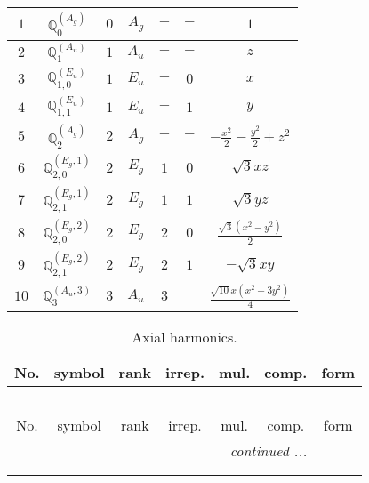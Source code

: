 \documentclass[fleqn,10pt,landscape]{article}
\begin{document}
\begin{itemize}
\begin{center}
\begin{longtable}{ccccccc}
$ 1 $ & $ \mathbb{Q}_{0}^{(A_{g})} $ & $ 0 $ & $ A_{g} $ & $ - $ & $ - $ & $ 1 $ \\ \hline
$ 2 $ & $ \mathbb{Q}_{1}^{(A_{u})} $ & $ 1 $ & $ A_{u} $ & $ - $ & $ - $ & $ z $ \\
$ 3 $ & $ \mathbb{Q}_{1,0}^{(E_{u})} $ & $ 1 $ & $ E_{u} $ & $ - $ & $ 0 $ & $ x $ \\
$ 4 $ & $ \mathbb{Q}_{1,1}^{(E_{u})} $ & $ 1 $ & $ E_{u} $ & $ - $ & $ 1 $ & $ y $ \\ \hline
$ 5 $ & $ \mathbb{Q}_{2}^{(A_{g})} $ & $ 2 $ & $ A_{g} $ & $ - $ & $ - $ & $ - \frac{x^{2}}{2} - \frac{y^{2}}{2} + z^{2} $ \\
$ 6 $ & $ \mathbb{Q}_{2,0}^{(E_{g},1)} $ & $ 2 $ & $ E_{g} $ & $ 1 $ & $ 0 $ & $ \sqrt{3} x z $ \\
$ 7 $ & $ \mathbb{Q}_{2,1}^{(E_{g},1)} $ & $ 2 $ & $ E_{g} $ & $ 1 $ & $ 1 $ & $ \sqrt{3} y z $ \\
$ 8 $ & $ \mathbb{Q}_{2,0}^{(E_{g},2)} $ & $ 2 $ & $ E_{g} $ & $ 2 $ & $ 0 $ & $ \frac{\sqrt{3} \left(x^{2} - y^{2}\right)}{2} $ \\
$ 9 $ & $ \mathbb{Q}_{2,1}^{(E_{g},2)} $ & $ 2 $ & $ E_{g} $ & $ 2 $ & $ 1 $ & $ - \sqrt{3} x y $ \\ \hline
$ 10 $ & $ \mathbb{Q}_{3}^{(A_{u},3)} $ & $ 3 $ & $ A_{u} $ & $ 3 $ & $ - $ & $ \frac{\sqrt{10} x \left(x^{2} - 3 y^{2}\right)}{4} $ \\
\end{longtable}
\end{center}
\begin{center}
\renewcommand{\arraystretch}{1.3}
\begin{longtable}{ccccccc}
\caption{Axial harmonics.}
 \\
 \hline \hline
No. & symbol & rank & irrep. & mul. & comp. & form \\ \hline \endfirsthead

\multicolumn{6}{l}{\tablename\ \thetable{}} \\
 \hline \hline
No. & symbol & rank & irrep. & mul. & comp. & form \\ \hline \endhead

 \hline \hline
\multicolumn{6}{r}{\footnotesize\it continued ...} \\ \endfoot

 \hline \hline
\multicolumn{6}{r}{} \\ \endlastfoot


\end{longtable}
\end{center}
\end{itemize}
\end{document}
